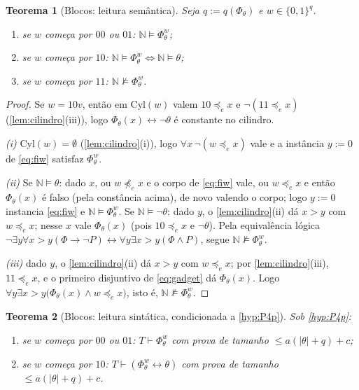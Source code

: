 \documentclass[11pt,a4paper]{article}
\newtheorem{theorem}{Teorema}[section]
\theoremstyle{definition}
\theoremstyle{remark}
\newcommand{\N}{\mathbb{N}}
\begin{document}
\begin{theorem}[Blocos: leitura sem\^{a}ntica]\label{thm:blocos-sem}
Seja $q := q(\Phi_\theta)$ e $w \in \{0,1\}^{q}$.
\begin{enumerate}
\item[\emph{(i)}] se $w$ começa por $00$ ou $01$: $\N \models \Phi_\theta^{w}$;
\item[\emph{(ii)}] se $w$ começa por $10$:
  $\N \models \Phi_\theta^{w} \iff \N \models \theta$;
\item[\emph{(iii)}] se $w$ começa por $11$: $\N \not\models \Phi_\theta^{w}$.
\end{enumerate}
\end{theorem}

\begin{proof}
Se $w = 10v$, então em $\mathrm{Cyl}(w)$ valem $10 \preceq_{e} x$ e
$\neg(11 \preceq_{e} x)$ (\cref{lem:cilindro}(iii)), logo
$\Phi_\theta(x) \leftrightarrow \neg\theta$ é constante no cilindro.

\emph{(i)} $\mathrm{Cyl}(w) = \emptyset$ (\cref{lem:cilindro}(i)), logo
$\forall x\, \neg(w \preceq_{e} x)$ vale e a instância $y := 0$ de
\eqref{eq:fiw} satisfaz $\Phi_\theta^{w}$.

\emph{(ii)} Se $\N \models \theta$: dado $x$, ou $w \not\preceq_{e} x$ e o
corpo de \eqref{eq:fiw} vale, ou $w \preceq_{e} x$ e então $\Phi_\theta(x)$
é falso (pela constância acima), de novo valendo o corpo; logo $y := 0$
instancia \eqref{eq:fiw} e $\N \models \Phi_\theta^{w}$. Se
$\N \models \neg\theta$: dado $y$, o \cref{lem:cilindro}(ii) dá $x > y$ com
$w \preceq_{e} x$; nesse $x$ vale $\Phi_\theta(x)$ (pois $10 \preceq_{e} x$
e $\neg\theta$). Pela equivalência lógica
$\neg\exists y\forall x>y(\Phi \rightarrow \neg P) \leftrightarrow
\forall y\exists x>y(\Phi \wedge P)$, segue $\N \not\models \Phi_\theta^{w}$.

\emph{(iii)} dado $y$, o \cref{lem:cilindro}(ii) dá $x > y$ com
$w \preceq_{e} x$; por \cref{lem:cilindro}(iii), $11 \preceq_{e} x$, e o
primeiro disjuntivo de \eqref{eq:gadget} dá $\Phi_\theta(x)$. Logo
$\forall y\exists x>y\bigl(\Phi_\theta(x) \wedge w \preceq_{e} x\bigr)$, isto
é, $\N \not\models \Phi_\theta^{w}$.
\end{proof}

\begin{theorem}[Blocos: leitura sint\'{a}tica, condicionada a
\cref{hyp:P4p}]\label{thm:blocos-sin}
Sob \cref{hyp:P4p}:
\begin{enumerate}
\item[\emph{(i)}] se $w$ começa por $00$ ou $01$:
  $T \vdash \Phi_\theta^{w}$ com prova de tamanho
  $\leq a(\lvert\theta\rvert + q) + c$;
\item[\emph{(ii)}] se $w$ começa por $10$:
  $T \vdash (\Phi_\theta^{w} \leftrightarrow \theta)$ com prova de tamanho
  $\leq a(\lvert\theta\rvert + q) + c$.
\end{enumerate}
\end{theorem}
\end{document}

